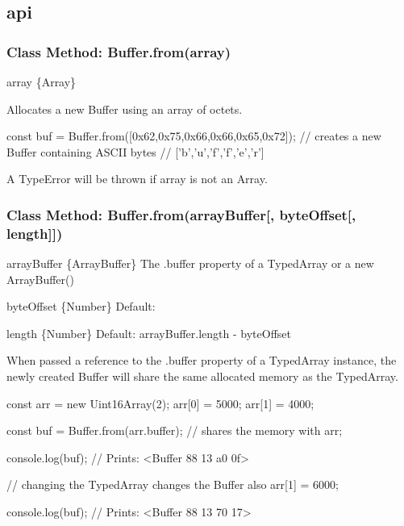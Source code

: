 \subsection*{api}

\subsubsection*{Class Method\+: Buffer.\+from(array)}


\begin{DoxyItemize}
\item {\ttfamily array} \{Array\}
\end{DoxyItemize}

Allocates a new {\ttfamily Buffer} using an {\ttfamily array} of octets.


\begin{DoxyCode}
const buf = Buffer.from([0x62,0x75,0x66,0x66,0x65,0x72]);
  // creates a new Buffer containing ASCII bytes
  // ['b','u','f','f','e','r']
\end{DoxyCode}


A {\ttfamily Type\+Error} will be thrown if {\ttfamily array} is not an {\ttfamily Array}.

\subsubsection*{Class Method\+: Buffer.\+from(array\+Buffer\mbox{[}, byte\+Offset\mbox{[}, length\mbox{]}\mbox{]})}


\begin{DoxyItemize}
\item {\ttfamily array\+Buffer} \{Array\+Buffer\} The {\ttfamily .buffer} property of a {\ttfamily Typed\+Array} or a {\ttfamily new Array\+Buffer()}
\item {\ttfamily byte\+Offset} \{Number\} Default\+: {}
\item {\ttfamily length} \{Number\} Default\+: {\ttfamily array\+Buffer.\+length -\/ byte\+Offset}
\end{DoxyItemize}

When passed a reference to the {\ttfamily .buffer} property of a {\ttfamily Typed\+Array} instance, the newly created {\ttfamily Buffer} will share the same allocated memory as the Typed\+Array.


\begin{DoxyCode}
const arr = new Uint16Array(2);
arr[0] = 5000;
arr[1] = 4000;

const buf = Buffer.from(arr.buffer); // shares the memory with arr;

console.log(buf);
  // Prints: <Buffer 88 13 a0 0f>

// changing the TypedArray changes the Buffer also
arr[1] = 6000;

console.log(buf);
  // Prints: <Buffer 88 13 70 17>
\end{DoxyCode}


